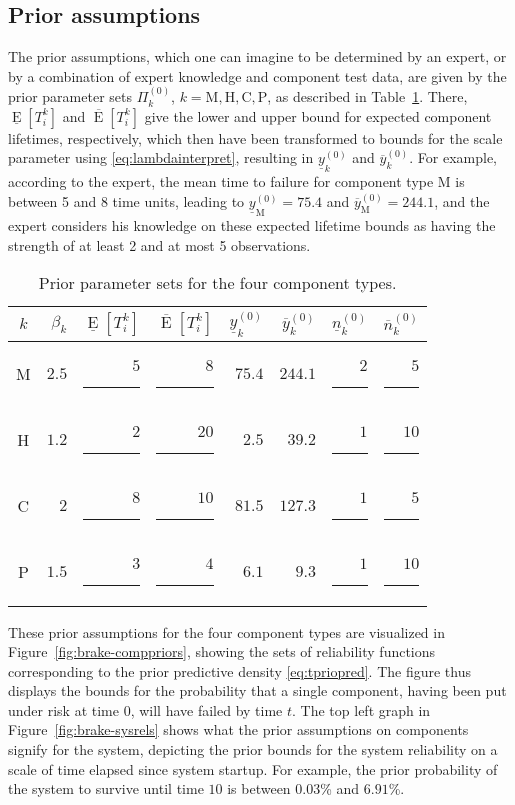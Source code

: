 \documentclass[Journal,SectionNumbers,InsideFigs]{ascelike}
\newcommand{\uz}{^{(0)}} %
\newcommand{\ul}[1]{\underline{#1}}
\newcommand{\ol}[1]{\overline{#1}}
\newcommand{\El}{\ul{\operatorname{E}}}
\newcommand{\Eu}{\ol{\operatorname{E}}}
\def\ykzl{\ul{y}\uz_k}
\def\ykzu{\ol{y}\uz_k}
\newcommand{\ykzlfun}[1]{\ul{y}\uz_{#1}}
\newcommand{\ykzufun}[1]{\ol{y}\uz_{#1}}
\def\nkzl{\ul{n}\uz_k}
\def\nkzu{\ol{n}\uz_k}
\def\PkZ{\Pi\uz_k}
\newcommand{\PZi}[1]{\Pi\uz_{#1}}
\begin{document}
\subsection{Prior assumptions}
\label{sec:ex-prior}

The prior assumptions, which one can imagine to be determined by an expert,
or by a combination of expert knowledge and component test data,
are given by the prior parameter sets $\PkZ$, $k=\text{M}, \text{H}, \text{C}, \text{P}$,
as described in Table~\ref{tab:priorparamsets}.
There, $\El[T_i^k]$ and $\Eu[T_i^k]$ give the lower and upper bound for expected component lifetimes, respectively,
which then have been transformed to bounds for the scale parameter using \eqref{eq:lambdainterpret},
resulting in $\ykzl$ and $\ykzu$.
For example, according to the expert, the mean time to failure for component type M is between 5 and 8 time units,
leading to $\ykzlfun{\text{M}} = 75.4$ and $\ykzufun{\text{M}} = 244.1$,
and the expert considers his knowledge on these expected lifetime bounds
as having the strength of at least 2 and at most 5 observations.  
\begin{table}
\centering
\begin{tabular}{crrrrrrr}
  \toprule
$k$ & $\beta_k$ & $\El[T_i^k]$ & $\Eu[T_i^k]$ & $\ykzl$ & $\ykzu$ & $\nkzl$ & $\nkzu$ \\
  \midrule
M & $2.5$ & $5$\rule{1.5ex}{0ex} & $ 8$\rule{1.5ex}{0ex} & $75.4$ & $244.1$ & $2$\rule{1ex}{0ex} & $ 5$\rule{1ex}{0ex} \\
H & $1.2$ & $2$\rule{1.5ex}{0ex} & $20$\rule{1.5ex}{0ex} & $ 2.5$ & $ 39.2$ & $1$\rule{1ex}{0ex} & $10$\rule{1ex}{0ex} \\
C & $2  $ & $8$\rule{1.5ex}{0ex} & $10$\rule{1.5ex}{0ex} & $81.5$ & $127.3$ & $1$\rule{1ex}{0ex} & $ 5$\rule{1ex}{0ex} \\
P & $1.5$ & $3$\rule{1.5ex}{0ex} & $ 4$\rule{1.5ex}{0ex} & $ 6.1$ & $  9.3$ & $1$\rule{1ex}{0ex} & $10$\rule{1ex}{0ex} \\
  \bottomrule
\end{tabular}
\caption{Prior parameter sets for the four component types.}
\label{tab:priorparamsets}
\end{table}

These prior assumptions for the four component types are visualized in Figure~\ref{fig:brake-comppriors},
showing the sets of reliability functions corresponding to the prior predictive density \eqref{eq:tpriopred}.
The figure thus displays the bounds for the probability that a single component,
having been put under risk at time $0$, will have failed by time $t$.
The top left graph in Figure~\ref{fig:brake-sysrels} shows what the prior assumptions on components
signify for the system, depicting the prior bounds for the system reliability %
on a scale of time elapsed since system startup.
For example, the prior probability of the system to survive until time $10$ is between $0.03$\% and $6.91$\%.
\end{document}
